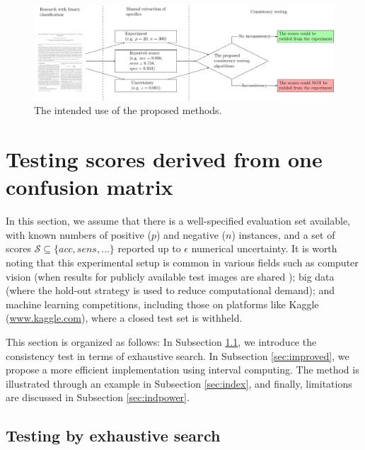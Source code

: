 \documentclass[3p, times]{elsarticle}
\begin{document}
\begin{figure}
\begin{center}
\includegraphics[width=\textwidth]{flowchart/figure.pdf}
\end{center}
\caption{The intended use of the proposed methods.}
\label{fig:illustration}
\end{figure}

\section{Testing scores derived from one confusion matrix}
\label{sec:ind}

In this section, we assume that there is a well-specified evaluation set available, with known numbers of positive ($p$) and negative ($n$) instances, and a set of scores $\mathcal{S}\subseteq\lbrace acc, sens, \dots\rbrace$ reported up to $\epsilon$ numerical uncertainty. 
It is worth noting that this experimental setup is common in various fields such as computer vision (when results for publicly available test images are shared \cite{vessel, isic2016}); big data (where the hold-out strategy is used to reduce computational demand); and machine learning competitions, including those on platforms like Kaggle (\url{www.kaggle.com}), where a closed test set is withheld.

This section is organized as follows: In Subsection \ref{sec:rommat}, we introduce the consistency test in terms of exhaustive search. In Subsection \ref{sec:improved}, we propose a more efficient implementation using interval computing. The method is illustrated through an example in Subsection \ref{sec:index}, and finally, limitations are discussed in Subsection \ref{sec:indpower}.

\subsection{Testing by exhaustive search}
\label{sec:rommat}
\end{document}
